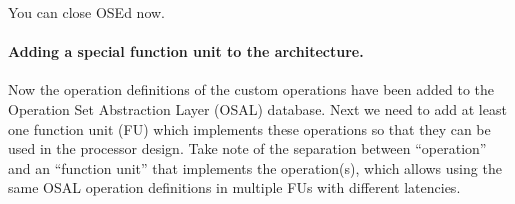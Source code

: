 \documentclass[twoside]{tceusermanual}
\begin{document}
You can close OSEd now.

% 

\paragraph{Adding a special function unit to the architecture.}

Now the operation definitions of the custom operations have been added to the
Operation Set Abstraction Layer (OSAL) database. Next we need to add at
least one function unit (FU) which implements these operations so that they
can be used in the processor design. Take note of the separation between ``operation'' and
an ``function unit'' that implements the operation(s), which allows using the
same OSAL operation definitions in multiple FUs with different latencies.
\end{document}

